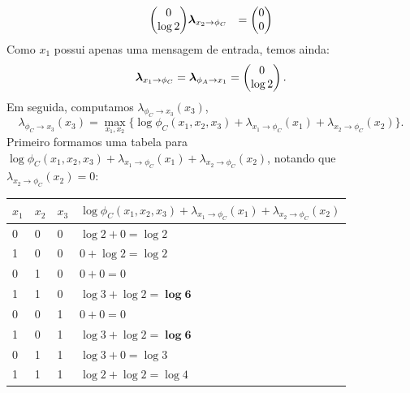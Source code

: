\begin{exenumerate}
\begin{solution}
\begin{align}
\begin{pmatrix}
                0\\
                \log 2
            \end{pmatrix}
            &
            \boldsymbol{\lambda}_{x_2 \to \phi_C} & = \begin{pmatrix}
                0\\
                0
            \end{pmatrix}
        \end{align}
        Como $x_1$ possui apenas uma mensagem de entrada, temos ainda:
        \begin{equation}
            \boldsymbol{\lambda}_{x_1 \to \phi_C} = \boldsymbol{\lambda}_{\phi_A \to x_1} =  \begin{pmatrix}
                0\\
                \log 2
            \end{pmatrix}.
        \end{equation}
        Em seguida, computamos $\lambda_{\phi_C \to x_3}(x_3)$,
        \begin{equation}
            \lambda_{\phi_C \to x_3}(x_3) = \max_{x_1, x_2} \{ \log \phi_C(x_1,x_2,x_3) + \lambda_{x_1 \to \phi_C}(x_1) + \lambda_{x_2 \to \phi_C}(x_2) \}.
        \end{equation}
        Primeiro formamos uma tabela para $\log \phi_C(x_1,x_2,x_3) + \lambda_{x_1 \to \phi_C}(x_1) + \lambda_{x_2 \to \phi_C}(x_2)$, notando que $\lambda_{x_2 \to \phi_C}(x_2)=0$:
        \begin{center}
            \begin{tabular}{llll}
                \toprule
                $x_1$ & $x_2$ & $x_3$ & $\log \phi_C(x_1,x_2,x_3) + \lambda_{x_1 \to \phi_C}(x_1) + \lambda_{x_2 \to \phi_C}(x_2)$  \\
                \midrule
                0 & 0 & 0 & $\log 2 + 0 = \log 2$ \\
                1 & 0 & 0 & $0+\log 2 = \log 2$ \\
                0 & 1 & 0 & $0+0 = 0$ \\
                1 & 1 & 0 & $\log 3+ \log 2 = \boldsymbol{\log 6}$ \\
                0 & 0 & 1 & $0+0 = 0 $ \\
                1 & 0 & 1 & $\log 3+ \log 2 = \boldsymbol{\log 6}$ \\
                0 & 1 & 1 & $\log 3+0 = \log 3$ \\
                1 & 1 & 1 & $\log 2+\log 2 = \log 4$ \\
                \bottomrule

\end{tabular}
\end{center}
\end{solution}
\end{exenumerate}
